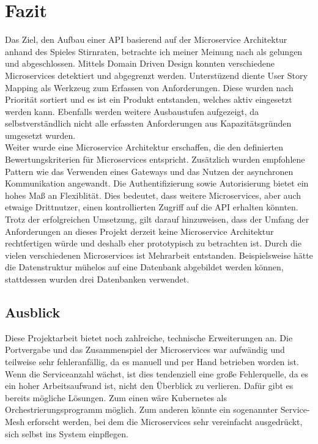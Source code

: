 \section{Fazit}

Das Ziel, den Aufbau einer API basierend auf der Microservice Architektur anhand des Spieles Stirnraten, betrachte ich meiner Meinung nach als gelungen und abgeschlossen. Mittels Domain Driven Design konnten verschiedene Microservices detektiert und abgegrenzt werden. Unterstüzend diente User Story Mapping als Werkzeug zum Erfassen von Anforderungen. Diese wurden nach Priorität sortiert und es ist ein Produkt entstanden, welches aktiv eingesetzt werden kann. Ebenfalls werden weitere Ausbaustufen aufgezeigt, da selbstverständlich nicht  alle erfassten Anforderungen aus Kapazitätsgründen umgesetzt wurden. \\

Weiter wurde eine Microservice Architektur erschaffen, die den definierten Bewertungskriterien für Microservices entspricht. Zusätzlich wurden empfohlene Pattern wie das Verwenden eines Gateways und das Nutzen der asynchronen Kommunikation angewandt. Die Authentifizierung sowie Autorisierung bietet ein hohes Maß an Flexiblität. Dies bedeutet, dass weitere Microservices, aber auch etwaige Drittnutzer, einen kontrollierten Zugriff auf die API erhalten könnten.\\

Trotz der erfolgreichen Umsetzung, gilt darauf hinzuweisen, dass der Umfang der Anforderungen an dieses Projekt derzeit keine Microservice Architektur rechtfertigen würde und deshalb eher prototypisch zu betrachten ist. Durch die vielen verschiedenen Microservices ist Mehrarbeit entstanden. Beispielsweise hätte die Datenstruktur mühelos auf eine Datenbank abgebildet werden können, stattdessen wurden drei Datenbanken verwendet. 

\subsection{Ausblick}
Diese Projektarbeit bietet noch zahlreiche, technische Erweiterungen an. Die Portvergabe und das Zusammenspiel der Microservices war aufwändig und teilweise sehr fehleranfällig, da es manuell und per Hand betrieben worden ist. Wenn die Serviceanzahl wächst, ist dies tendenziell eine große Fehlerquelle, da es ein hoher Arbeitsaufwand ist, nicht den Überblick zu verlieren. Dafür gibt es bereits mögliche Lösungen. Zum einen wäre Kubernetes als Orchestrierungsprogramm möglich. Zum anderen könnte ein sogenannter Service-Mesh erforscht werden, bei dem die Microservices sehr vereinfacht ausgedrückt, sich selbst ins System einpflegen. \\

